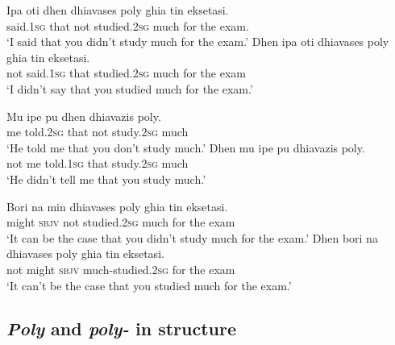 \documentclass[output=paper]{langscibook}
\begin{document}
\begin{exe}
\ex\label{gia:ex21} \begin{xlist}
        \ex\label{gia:ex21a} \gll Ipa oti dhen dhiavases poly ghia tin eksetasi. \\
        said.\textsc{1sg} that not studied.\textsc{2sg} much for the exam. \\
        \trans `I said that you didn't study much for the exam.'
        \ex\label{gia:ex21b} \gll Dhen ipa oti dhiavases poly ghia tin eksetasi. \\
        not said.\textsc{1sg} that studied.\textsc{2sg} much for the exam \\
        \trans `I didn't say that you studied much for the exam.'
    \end{xlist}

\ex\label{gia:ex22} \begin{xlist}
        \ex\label{gia:ex22a} \gll Mu ipe pu dhen dhiavazis poly. \\
        me told.\textsc{2sg} that not study.\textsc{2sg} much \\
        \trans `He told me that you don't study much.'
        \ex\label{gia:ex22b} \gll Dhen mu ipe pu dhiavazis poly. \\
        not me told.\textsc{1sg} that study.\textsc{2sg} much \\
        \trans `He didn't tell me that you study much.'
    \end{xlist}

\ex\label{gia:ex23} \begin{xlist}
        \ex\label{gia:ex23a} \gll Bori na min dhiavases poly ghia tin eksetasi. \\
        might \textsc{sbjv} not studied.\textsc{2sg} much for the exam \\
        \trans `It can be the case that you didn't study much for the exam.'
        \ex\label{gia:ex23b} \gll Dhen bori na dhiavases poly ghia tin eksetasi. \\
        not might \textsc{sbjv} much-studied.\textsc{2sg} for the exam \\
        \trans `It can't be the case that you studied much for the exam.'
    \end{xlist}
\end{exe}

\subsection{\textit{Poly} and \textit{poly-} in structure} \label{gia:sub:structure}
\end{document}
